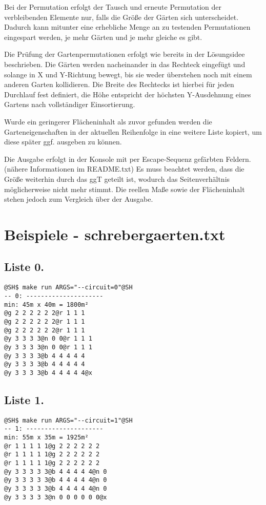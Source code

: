 \documentclass[a4paper,10pt,ngerman]{scrartcl}
\begin{document}
Bei der Permutation erfolgt der Tausch und erneute Permutation der verbleibenden Elemente nur, falls die Größe der Gärten sich unterscheidet. Dadurch kann mitunter eine erhebliche Menge an zu testenden Permutationen eingespart werden, je mehr Gärten und je mehr gleiche es gibt.

Die Prüfung der Gartenpermutationen erfolgt wie bereits in der Lösungsidee beschrieben.
Die Gärten werden nacheinander in das Rechteck eingefügt und solange in X und Y-Richtung bewegt, bis sie weder überstehen noch mit einem anderen Garten kollidieren. Die Breite des Rechtecks ist hierbei für jeden Durchlauf fest definiert, die Höhe entspricht der höchsten Y-Ausdehnung eines Gartens nach vollständiger Einsortierung.

Wurde ein geringerer Flächeninhalt als zuvor gefunden werden die Garteneigenschaften in der aktuellen Reihenfolge in eine weitere Liste kopiert, um diese später ggf. ausgeben zu können.

Die Ausgabe erfolgt in der Konsole mit per Escape-Sequenz gefärbten Feldern. (nähere Informationen im README.txt) Es muss beachtet werden, dass die Größe weiterhin durch das ggT geteilt ist, wodurch das Seitenverhältnis möglicherweise nicht mehr stimmt. Die reellen Maße sowie der Flächeninhalt stehen jedoch zum Vergleich über der Ausgabe.


\pagebreak
\section[Beispiele]{Beispiele - schrebergaerten.txt}

\subsection{Liste 0.}
\begin{lstlisting}
@SH$ make run ARGS="--circuit=0"@SH
-- 0: ---------------------
min: 45m x 40m = 1800m²
@g 2 2 2 2 2 2@r 1 1 1
@g 2 2 2 2 2 2@r 1 1 1
@g 2 2 2 2 2 2@r 1 1 1
@y 3 3 3 3@n 0 0@r 1 1 1
@y 3 3 3 3@n 0 0@r 1 1 1
@y 3 3 3 3@b 4 4 4 4 4
@y 3 3 3 3@b 4 4 4 4 4
@y 3 3 3 3@b 4 4 4 4 4@x
\end{lstlisting}

\subsection{Liste 1.}
\begin{lstlisting}
@SH$ make run ARGS="--circuit=1"@SH
-- 1: ---------------------
min: 55m x 35m = 1925m²
@r 1 1 1 1 1@g 2 2 2 2 2 2
@r 1 1 1 1 1@g 2 2 2 2 2 2
@r 1 1 1 1 1@g 2 2 2 2 2 2
@y 3 3 3 3 3@b 4 4 4 4 4@n 0
@y 3 3 3 3 3@b 4 4 4 4 4@n 0
@y 3 3 3 3 3@b 4 4 4 4 4@n 0
@y 3 3 3 3 3@n 0 0 0 0 0 0@x
\end{lstlisting}
\end{document}
